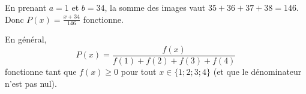 {	En prenant $a = 1$ et $b=34$, la somme des images vaut $35+36+37+38=146$.
	Donc $P(x) = \frac{x+34}{146}$ fonctionne.
	
	En général,
		\[ P(x) = \frac{f(x)}{f(1)+f(2)+f(3)+f(4)} \]
	fonctionne tant que $f(x) \geq 0$ pour tout $x\in\{1;2;3;4\}$ (et que le dénominateur n'est pas nul).
}


\label{lastpage}
\newpage
{}
\shipoutAnswer
	

